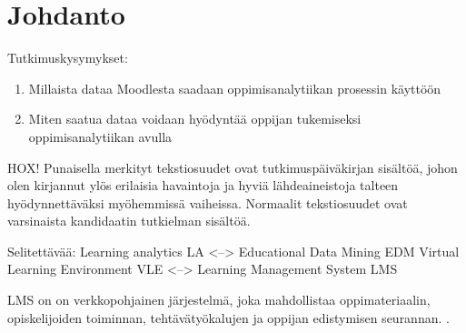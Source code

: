 \chapter{Johdanto\label{johdanto}}

Tutkimuskysymykset:
\begin{enumerate}
    \item Millaista dataa Moodlesta saadaan oppimisanalytiikan prosessin käyttöön
    \item Miten saatua dataa voidaan hyödyntää oppijan tukemiseksi oppimisanalytiikan avulla
\end{enumerate}

HOX! Punaisella merkityt tekstiosuudet ovat tutkimuspäiväkirjan sisältöä, johon olen kirjannut ylös erilaisia havaintoja ja hyviä lähdeaineistoja talteen hyödynnettäväksi myöhemmissä vaiheissa. Normaalit tekstiosuudet ovat varsinaista kandidaatin tutkielman sisältöä.

Selitettävää:
Learning analytics LA <--> Educational Data Mining EDM
Virtual Learning Environment VLE <--> Learning Management System LMS

LMS on on verkkopohjainen järjestelmä, joka mahdollistaa oppimateriaalin, opiskelijoiden toiminnan, tehtävätyökalujen ja oppijan edistymisen seurannan. \citep{mohdChoosingRightLearning2016}. \citep{romeroSurveyPreProcessingEducational2014}